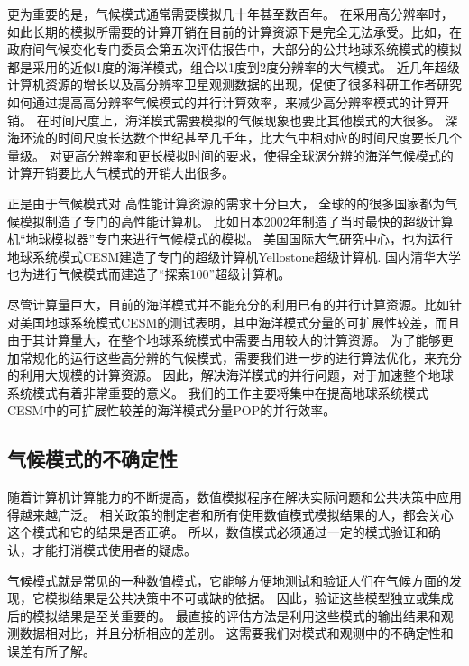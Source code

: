 更为重要的是，气候模式通常需要模拟几十年甚至数百年。
在采用高分辨率时，如此长期的模拟所需要的计算开销在目前的计算资源下是完全无法承受。比如，在政府间气候变化专门委员会第五次评估报告中，大部分的公共地球系统模式的模拟都是采用的近似1度的海洋模式，组合以1度到2度分辨率的大气模式。
近几年超级计算机资源的增长以及高分辨率卫星观测数据的出现，促使了很多科研工作者研究如何通过提高高分辨率气候模式的并行计算效率，来减少高分辨率模式的计算开销。
在时间尺度上，海洋模式需要模拟的气候现象也要比其他模式的大很多。 深海环流的时间尺度长达数个世纪甚至几千年，比大气中相对应的时间尺度要长几个量级。
对更高分辨率和更长模拟时间的要求，使得全球涡分辨的海洋气候模式的计算开销要比大气模式的开销大出很多\cite{bryan2010frontal,mcclean2011prototype,graham2014importance}。

正是由于气候模式对 高性能计算资源的需求十分巨大， 全球的的很多国家都为气候模拟制造了专门的高性能计算机。 比如日本2002年制造了当时最快的超级计算机“地球模拟器”专门来进行气候模式的模拟\cite{habata2003earth}。
美国国际大气研究中心，也为运行地球系统模式CESM建造了专门的超级计算机Yellostone超级计算机\cite{loft:2015}. 
国内清华大学也为进行气候模式而建造了“探索100”超级计算机。



尽管计算量巨大，目前的海洋模式并不能充分的利用已有的并行计算资源。比如针对美国地球系统模式CESM的测试表明，其中海洋模式分量的可扩展性较差，而且由于其计算量大，在整个地球系统模式中需要占用较大的计算资源。
为了能够更加常规化的运行这些高分辨的气候模式，需要我们进一步的进行算法优化，来充分的利用大规模的计算资源。
因此，解决海洋模式的并行问题，对于加速整个地球系统模式有着非常重要的意义。
我们的工作主要将集中在提高地球系统模式CESM中的可扩展性较差的海洋模式分量POP的并行效率。  
 

\subsection{气候模式的不确定性}
随着计算机计算能力的不断提高，数值模拟程序在解决实际问题和公共决策中应用得越来越广泛。 
相关政策的制定者和所有使用数值模式模拟结果的人，都会关心这个模式和它的结果是否正确。
所以，数值模式必须通过一定的模式验证和确认，才能打消模式使用者的疑虑\cite{whitner1989guidelines,stainforth2005uncertainty}。

气候模式就是常见的一种数值模式，它能够方便地测试和验证人们在气候方面的发现，它模拟结果是公共决策中不可或缺的依据\cite{allen2002towards,reynolds1994random}。
因此，验证这些模型独立或集成后的模拟结果是至关重要的。
最直接的评估方法是利用这些模式的输出结果和观测数据相对比，并且分析相应的差别。 
这需要我们对模式和观测中的不确定性和误差有所了解。 

